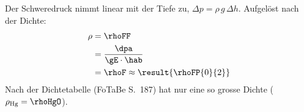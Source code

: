 Der Schweredruck nimmt linear mit der Tiefe zu, $\Delta p = \rho\,g\,\Delta h$. Aufgelöst nach der Dichte:
\begin{align}
 \rho &= \rhoFF \\
   &= \frac{\dpa}{\gE\cdot\hab} \\
   &= \rhoF \approx \result{\rhoFP{0}{2}}
\end{align}
Nach der Dichtetabelle (FoTaBe S.~187) hat nur  eine so grosse Dichte ($\rho_\text{Hg} = \rhoHgO$).
